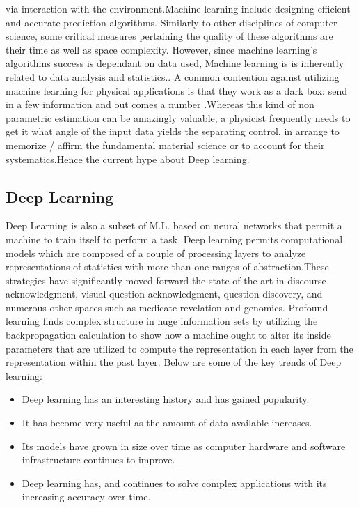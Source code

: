 via interaction with the environment.Machine learning include designing efficient and accurate prediction algorithms. Similarly to other disciplines of computer science, some critical measures pertaining the quality of these algorithms are their time as well as space complexity. However, since machine learning's algorithms success is dependant on data used, Machine learning is is inherently related to data analysis and statistics.\vspace{5mm}.
A common contention against utilizing machine learning for physical applications is that they work as a dark box: send in a few information and out comes a number \cite{zhang2020machine}.Whereas this kind of non parametric estimation can be amazingly valuable, a physicist frequently needs to get it what angle of the input data yields the separating control, in arrange to memorize / affirm the fundamental material science or to account for their systematics.Hence the current hype about Deep learning.



\subsection{Deep Learning}
Deep Learning is also a subset of M.L. based on neural networks that permit a machine to train itself to perform a task. Deep learning permits computational models which are composed of a couple of processing layers to analyze representations of statistics with more than one ranges of abstraction.These strategies have significantly moved forward the state-of-the-art in discourse acknowledgment, visual question acknowledgment, question discovery, and numerous other spaces such as medicate revelation and genomics. Profound learning finds complex structure in huge information sets by utilizing the backpropagation calculation to show how a machine ought to alter its inside parameters that are utilized to compute the representation in each layer from the representation within the past layer.\cite{lecun2015deep}
Below are some of the key trends of Deep learning:
\begin{itemize}
    \item Deep learning has an interesting history and has gained popularity.
    \item It has become very useful as the amount of data available increases.
    \item Its models have grown in size over time as computer hardware and software infrastructure continues to improve.
    \item Deep learning has, and continues to solve complex applications with its increasing accuracy over time.
\end{itemize}

